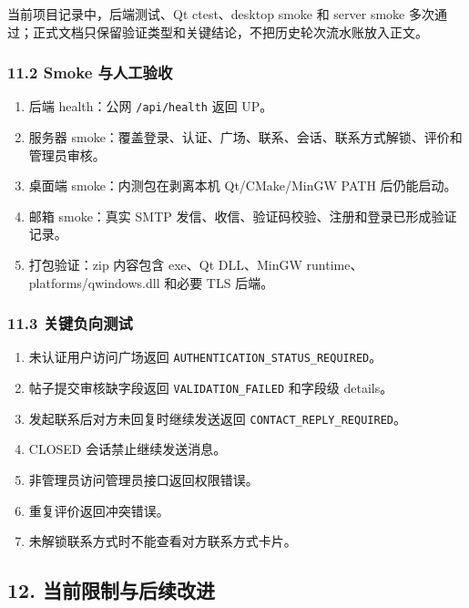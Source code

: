 \documentclass[
]{ctexart}
\providecommand{\tightlist}{%
  \setlength{\itemsep}{0pt}\setlength{\parskip}{0pt}}
\begin{document}
当前项目记录中，后端测试、Qt ctest、desktop smoke 和 server smoke
多次通过；正式文档只保留验证类型和关键结论，不把历史轮次流水账放入正文。

\hypertarget{smoke-ux4e0eux4ebaux5de5ux9a8cux6536}{%
\subsubsection{11.2 Smoke
与人工验收}\label{smoke-ux4e0eux4ebaux5de5ux9a8cux6536}}

\begin{enumerate}
\def\labelenumi{\arabic{enumi}.}
\tightlist
\item
  后端 health：公网 \texttt{/api/health} 返回 UP。
\item
  服务器
  smoke：覆盖登录、认证、广场、联系、会话、联系方式解锁、评价和管理员审核。
\item
  桌面端 smoke：内测包在剥离本机 Qt/CMake/MinGW PATH 后仍能启动。
\item
  邮箱 smoke：真实 SMTP
  发信、收信、验证码校验、注册和登录已形成验证记录。
\item
  打包验证：zip 内容包含 exe、Qt DLL、MinGW
  runtime、platforms/qwindows.dll 和必要 TLS 后端。
\end{enumerate}

\hypertarget{ux5173ux952eux8d1fux5411ux6d4bux8bd5}{%
\subsubsection{11.3
关键负向测试}\label{ux5173ux952eux8d1fux5411ux6d4bux8bd5}}

\begin{enumerate}
\def\labelenumi{\arabic{enumi}.}
\tightlist
\item
  未认证用户访问广场返回 \texttt{AUTHENTICATION\_STATUS\_REQUIRED}。
\item
  帖子提交审核缺字段返回 \texttt{VALIDATION\_FAILED} 和字段级 details。
\item
  发起联系后对方未回复时继续发送返回 \texttt{CONTACT\_REPLY\_REQUIRED}。
\item
  CLOSED 会话禁止继续发送消息。
\item
  非管理员访问管理员接口返回权限错误。
\item
  重复评价返回冲突错误。
\item
  未解锁联系方式时不能查看对方联系方式卡片。
\end{enumerate}

\hypertarget{ux5f53ux524dux9650ux5236ux4e0eux540eux7eedux6539ux8fdb}{%
\subsection{12.
当前限制与后续改进}\label{ux5f53ux524dux9650ux5236ux4e0eux540eux7eedux6539ux8fdb}}
\end{document}
